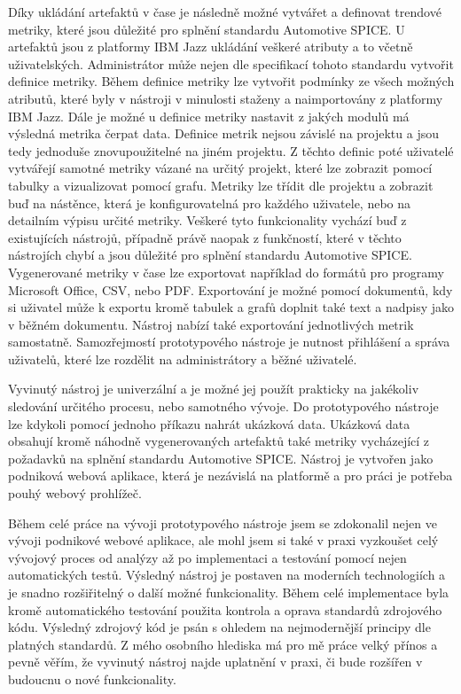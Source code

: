 \documentclass[czech,master,public,dept460,male,cpdeclaration,oneside]{diploma}
\begin{document}
Díky ukládání artefaktů v čase je následně možné vytvářet a definovat trendové metriky, které jsou důležité pro splnění standardu Automotive SPICE. U artefaktů jsou z platformy IBM Jazz ukládání veškeré atributy a to včetně uživatelských. Administrátor může nejen dle specifikací tohoto standardu vytvořit definice metriky. Během definice metriky lze vytvořit podmínky ze všech možných atributů, které byly v nástroji v minulosti staženy a naimportovány z platformy IBM Jazz. Dále je možné u definice metriky nastavit z jakých modulů má výsledná metrika čerpat data. Definice metrik nejsou závislé na projektu a jsou tedy jednoduše znovupoužitelné na jiném projektu. Z těchto definic poté uživatelé vytvářejí samotné metriky vázané na určitý projekt, které lze zobrazit pomocí tabulky a vizualizovat pomocí grafu. Metriky lze třídit dle projektu a zobrazit buď na nástěnce, která je konfigurovatelná pro každého uživatele, nebo na detailním výpisu určité metriky. Veškeré tyto funkcionality vychází buď z existujících nástrojů, případně právě naopak z funkčností, které v těchto nástrojích chybí a jsou důležité pro splnění standardu Automotive SPICE. Vygenerované metriky v čase lze exportovat například do formátů pro programy Microsoft Office, CSV, nebo PDF. Exportování je možné pomocí dokumentů, kdy si uživatel může k exportu kromě tabulek a grafů doplnit také text a nadpisy jako v běžném dokumentu. Nástroj nabízí také exportování jednotlivých metrik samostatně. Samozřejmostí prototypového nástroje je nutnost přihlášení a správa uživatelů, které lze rozdělit na administrátory a běžné uživatelé.

Vyvinutý nástroj je univerzální a je možné jej použít prakticky na jakékoliv sledování určitého procesu, nebo samotného vývoje. Do prototypového nástroje lze kdykoli pomocí jednoho příkazu nahrát ukázková data. Ukázková data obsahují kromě náhodně vygenerovaných artefaktů také metriky vycházející z požadavků na splnění standardu Automotive SPICE. Nástroj je vytvořen jako podniková webová aplikace, která je nezávislá na platformě a pro práci je potřeba pouhý webový prohlížeč. 

Během celé práce na vývoji prototypového nástroje jsem se zdokonalil nejen ve vývoji podnikové webové aplikace, ale mohl jsem si také v praxi vyzkoušet celý vývojový proces od analýzy až po implementaci a testování pomocí nejen automatických testů. Výsledný nástroj je postaven na moderních technologiích a je snadno rozšiřitelný o další možné funkcionality. Během celé implementace byla kromě automatického testování použita kontrola a oprava standardů zdrojového kódu. Výsledný zdrojový kód je psán s ohledem na nejmodernější principy dle platných standardů. Z mého osobního hlediska má pro mě práce velký přínos a pevně věřím, že vyvinutý nástroj najde uplatnění v praxi, či bude rozšířen v budoucnu o nové funkcionality.
\end{document}
